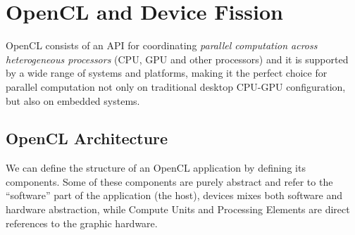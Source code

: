 \section{OpenCL and Device Fission}

OpenCL consists of an API for coordinating \textit{parallel computation across heterogeneous processors} (CPU, GPU and other processors) and it is supported by a wide range of systems and platforms, making it the perfect choice for parallel computation not only on traditional desktop CPU-GPU configuration, but also on embedded systems.


\subsection{OpenCL Architecture} \label{sect:openCLArch}

%
%
%
We can define the structure of an OpenCL application by defining its components. Some of these components are purely abstract and refer to the "`software"' part of the application (the host), devices mixes both software and hardware abstraction, while Compute Units and Processing Elements are direct references to the graphic hardware.

